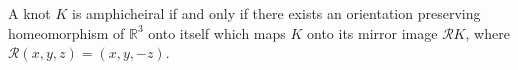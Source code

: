 A knot $K$ is amphicheiral if and only if there exists an orientation preserving homeomorphism of $\mathbb{R}^3$ onto itself which maps $K$ onto its mirror image $\mathcal{R}K$, where $\mathcal{R}(x,y,z) = (x,y,-z)$.

